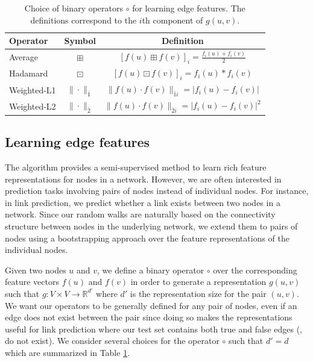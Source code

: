 \begin{table}
\centering
\begin{tabular}{l|c|c}
\textbf{Operator} & \textbf{Symbol} & \textbf{Definition} \\ \hline
Average & $\boxplus$ & $[f(u) \boxplus f(v)]_i = \frac{f_i(u)+f_i(v)}{2}$ \\
Hadamard & $\boxdot$ & $[f(u) \boxdot f(v)]_i = f_i(u)*f_i(v)$ \\
Weighted-L1 & $\| \cdot \|_{\bar{1}}$ & $\|f(u) \cdot f(v)\|_{\bar{1}i} = |f_i(u)-f_i(v)|$ \\
Weighted-L2 & $\| \cdot \|_{\bar{2}}$ & $\|f(u) \cdot f(v)\|_{\bar{2}i} = |f_i(u)-f_i(v)|^2$
\end{tabular}
\vspace{-0.2cm}
\caption{Choice of binary operators $\circ$ for learning edge features. The definitions correspond to the $i${th} component of $g(u,v)$.
}
\vspace{-0.4cm}
\label{tab:edgeop}
\end{table} 

\subsection{Learning edge features}
The \nodevec algorithm provides a semi-supervised method to learn rich feature representations for nodes in a network. However, we are often interested in prediction tasks involving pairs of nodes instead of individual nodes. For instance, in link prediction, we predict whether a link exists between two nodes in a network. Since our random walks are naturally based on the connectivity structure between nodes in the underlying network, we extend them to pairs of nodes using a bootstrapping approach over the feature representations of the individual nodes.

Given two nodes $u$ and $v$, we define a binary operator $\circ$ over the corresponding feature vectors $f(u)$ and $f(v)$ in order to generate a representation $g(u,v)$ such that $g: V \times V \rightarrow \mathbb{R}^{d'}$ where $d'$ is the representation size for the pair $(u,v)$. We want our operators to be generally defined for any pair of nodes, even if an edge does not exist between the pair since doing so makes the representations useful for link prediction where our test set contains both true and false edges (\ie, do not exist). We consider several choices for the operator $\circ$ such that $d'= d$ which are summarized in Table \ref{tab:edgeop}.


